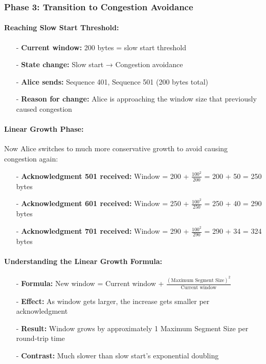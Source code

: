 \documentclass[../../compsys.tex]{subfiles}
\begin{document}
\subsubsection{Phase 3: Transition to Congestion Avoidance}

\paragraph{Reaching Slow Start Threshold:}
\begin{itemize}
  \item[-] \textbf{Current window:} 200 bytes = slow start threshold
  \item[-] \textbf{State change:} Slow start → Congestion avoidance
  \item[-] \textbf{Alice sends:} Sequence 401, Sequence 501 (200 bytes total)
  \item[-] \textbf{Reason for change:} Alice is approaching the window size that previously caused congestion
\end{itemize}

\paragraph{Linear Growth Phase:}

Now Alice switches to much more conservative growth to avoid causing congestion again:

\begin{itemize}
  \item[-] \textbf{Acknowledgment 501 received:} Window = 200 + $\frac{100^2}{200}$ = 200 + 50 = 250 bytes
  \item[-] \textbf{Acknowledgment 601 received:} Window = 250 + $\frac{100^2}{250}$ = 250 + 40 = 290 bytes
  \item[-] \textbf{Acknowledgment 701 received:} Window = 290 + $\frac{100^2}{290}$ = 290 + 34 = 324 bytes
\end{itemize}

\paragraph{Understanding the Linear Growth Formula:}
\begin{itemize}
  \item[-] \textbf{Formula:} New window = Current window + $\frac{(\text{Maximum Segment Size})^2}{\text{Current window}}$
  \item[-] \textbf{Effect:} As window gets larger, the increase gets smaller per acknowledgment
  \item[-] \textbf{Result:} Window grows by approximately 1 Maximum Segment Size per round-trip time
  \item[-] \textbf{Contrast:} Much slower than slow start's exponential doubling
\end{itemize}
\end{document}
